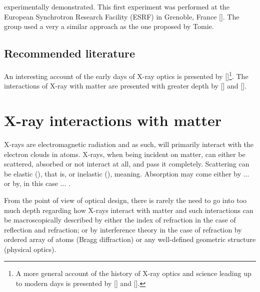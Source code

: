 \begin{refsection}
experimentally demonstrated. This first experiment was performed at the European Synchrotron Research Facility (ESRF) in  Grenoble, France [\cite{Snigirev1996}]. The group used a very a similar approach as the one proposed by Tomie.

\subsection*{Recommended literature}

An interesting account of the early days of X-ray optics is presented by [\cite{Compton1928}]\footnote{A more general account of the history of X-ray optics and science leading up to modern days is presented by [\cite[\textit{§1}]{Willmott2019}] and [\cite[\textit{§2}]{Jacobsen2019}].}. The interactions of X-ray with matter are presented with greater depth by [\cite{Als-Nielsen2011}] and [\cite[\textit{§1} - \textit{\textit{§3}}]{Attwood2016}].


\section{X-ray interactions with matter}\label{sec:interaction_with_matter}

X-rays are electromagnetic radiation and as such, will primarily interact with the electron clouds in atoms. X-rays, when being incident on matter, can either be scattered, absorbed or not interact at all, and pass it completely. Scattering can be elastic (), that is, or inelastic (), meaning. Absorption may come either by ... or by, in this case ... .


From the point of view of optical design, there is rarely the need to go into too much depth regarding how X-rays interact with matter and such interactions can be macroscopically described by either the index of refraction in the case of reflection and refraction; or by interference theory in the case of refraction by ordered array of atoms (Bragg diffraction) or any well-defined geometric structure (physical optics).


\end{refsection}
